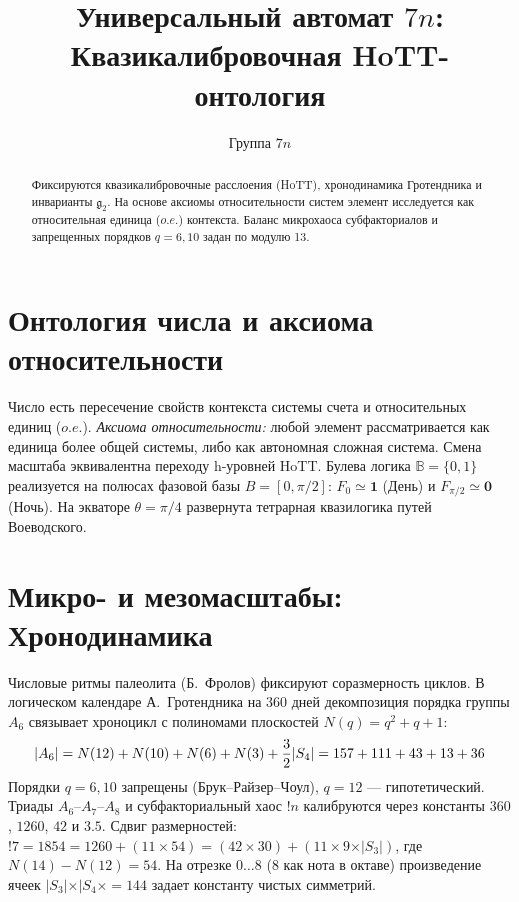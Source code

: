 \documentclass[10pt,twocolumn,fleqn]{article}
\title{\vspace{-4ex}\small\bf Универсальный автомат $7n$: Квазикалибровочная HoTT-онтология}
\author{\small Группа $7n$}\date{\vspace{-9ex}}
\begin{document}
\maketitle

\begin{abstract}
\tiny Фиксируются квазикалибровочные расслоения (HoTT), хронодинамика Гротендника и инварианты $\mathfrak{g}_2$. На основе аксиомы относительности систем элемент исследуется как относительная единица ($o.e.$) контекста. Баланс микрохаоса субфакториалов и запрещенных порядков $q=6,10$ задан по модулю 13.
\end{abstract}

\section{Онтология числа и аксиома относительности}
Число есть пересечение свойств контекста системы счета и относительных единиц ($o.e.$). \textit{Аксиома относительности:} любой элемент рассматривается как единица более общей системы, либо как автономная сложная система. Смена масштаба эквивалентна переходу h-уровней HoTT. Булева логика $\mathbb{B}=\{0,1\}$ реализуется на полюсах фазовой базы $B=[0, \pi/2]$: $F_0 \simeq \mathbf{1}$ (День) и $F_{\pi/2} \simeq \mathbf{0}$ (Ночь). На экваторе $\theta = \pi/4$ развернута тетрарная квазилогика путей Воеводского.

\section{Микро- и мезомасштабы: Хронодинамика}
Числовые ритмы палеолита (Б.~Фролов) фиксируют соразмерность циклов. В логическом календаре А.~Гротендника на 360 дней декомпозиция порядка группы $A_6$ связывает хроноцикл с полиномами плоскостей $N(q) = q^2 + q + 1$:
\begin{equation}\small
    \vert A_6 \vert = N(12) + N(10) + N(6) + N(3) + \frac{3}{2}\vert S_4 \vert = 157 + 111 + 43 + 13 + 36
\end{equation}
Порядки $q=6,10$ запрещены (Брук--Райзер--Чоул), $q=12$ --- гипотетический. Триады $A_6\text{--}A_7\text{--}A_8$ и субфакториальный хаос $!n$ калибруются через константы $360$, $1260$, $42$ и $3.5$. Сдвиг размерностей: $!7 = 1854 = 1260 + (11 \times 54) = (42 \times 30) + (11 \times 9 \times \vert S_3 \vert)$, где $N(14) - N(12) = 54$. На отрезке $0 \dots 8$ (8 как нота в октаве) произведение ячеек $\vert S_3 \vert \times \vert S_4 \times = 144$ задает константу чистых симметрий.
\end{document}
